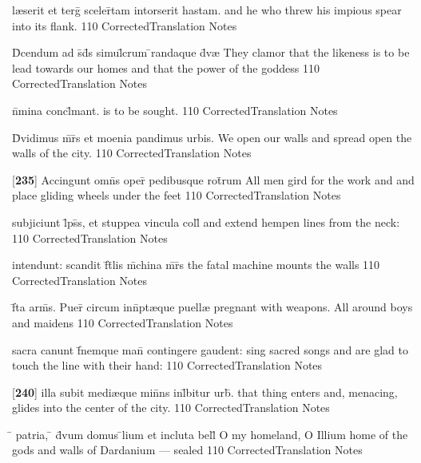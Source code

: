 \latline
  {l{\ae}serit et terg\={} sceler\={}tam intorserit hastam.}
  { and he who threw his impious spear into its flank. }
  {110}
  { CorrectedTranslation }
  { Notes }


\latline
  {D\={}cendum ad s\={}d\={}s simul\={}crum \={}randaque d\={\macron {\i}}v{\ae}}
  { They clamor that the likeness is to be lead towards our homes and that the power of the goddess  }
  {110}
  { CorrectedTranslation }
  { Notes }


\latline
  {n\={}mina concl\={}mant.}
  { is to be sought. }
  {110}
  { CorrectedTranslation }
  { Notes }


\latline
  {D\={\macron {\i}}vidimus m\={}r\={}s et moenia pandimus urbis.}
  { We open our walls and spread open the walls of the city. }
  {110}
  { CorrectedTranslation }
  { Notes }


\latline
  {[\textbf{235}] Accingunt omn\={}s oper\={\macron {\i}} pedibusque rot\={}rum}
  { All men gird for the work and and place gliding wheels under the feet  }
  {110}
  { CorrectedTranslation }
  { Notes }


\latline
  {subjiciunt l\={}ps\={}s, et stuppea vincula coll\={}}
  { and extend hempen lines from the neck: }
  {110}
  { CorrectedTranslation }
  { Notes }


\latline
  {intendunt: scandit f\={}t\={}lis m\={}china m\={}r\={}s}
  { the fatal machine mounts the walls  }
  {110}
  { CorrectedTranslation }
  { Notes }


\latline
  {f\={}ta arm\={\macron {\i}}s.  Puer\={\macron {\i}} circum inn\={}pt{\ae}que puell{\ae}}
  { pregnant with weapons.  All around boys and maidens }
  {110}
  { CorrectedTranslation }
  { Notes }


\latline
  {sacra canunt f\={}nemque man\={} contingere gaudent:}
  { sing sacred songs and are glad to touch the line with their hand: }
  {110}
  { CorrectedTranslation }
  { Notes }


\latline
  {[\textbf{240}] illa subit medi{\ae}que min\={}ns inl\={}bitur urb\={\macron {\i}}.}
  { that thing enters and, menacing, glides into the center of the city. }
  {110}
  { CorrectedTranslation }
  { Notes }


\latline
  {\={} patria, \={} d\={\macron {\i}}vum domus \={}lium et incluta bell\={}}
  { O my homeland, O Illium home of the gods and walls of Dardanium  --- sealed}
  {110}
  { CorrectedTranslation }
  { Notes }


